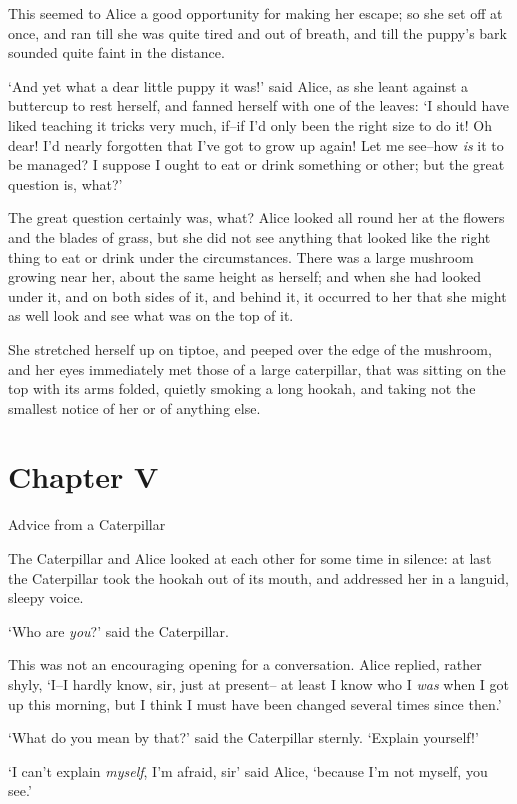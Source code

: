   This seemed to Alice a good opportunity for making her escape;
so she set off at once, and ran till she was quite tired and out
of breath, and till the puppy's bark sounded quite faint in the
distance.

  `And yet what a dear little puppy it was!' said Alice, as she
leant against a buttercup to rest herself, and fanned herself
with one of the leaves:  `I should have liked teaching it tricks
very much, if--if I'd only been the right size to do it!  Oh
dear!  I'd nearly forgotten that I've got to grow up again!  Let
me see--how {\it is} it to be managed?  I suppose I ought to eat or
drink something or other; but the great question is, what?'

  The great question certainly was, what?  Alice looked all round
her at the flowers and the blades of grass, but she did not see
anything that looked like the right thing to eat or drink under
the circumstances.  There was a large mushroom growing near her,
about the same height as herself; and when she had looked under
it, and on both sides of it, and behind it, it occurred to her
that she might as well look and see what was on the top of it.

  She stretched herself up on tiptoe, and peeped over the edge of
the mushroom, and her eyes immediately met those of a large
caterpillar, that was sitting on the top with its arms folded,
quietly smoking a long hookah, and taking not the smallest notice
of her or of anything else.



\chapter{Chapter V}{Advice from a Caterpillar}


  The Caterpillar and Alice looked at each other for some time in
silence:  at last the Caterpillar took the hookah out of its
mouth, and addressed her in a languid, sleepy voice.

  `Who are {\it you}?' said the Caterpillar.

  This was not an encouraging opening for a conversation.  Alice
replied, rather shyly, `I--I hardly know, sir, just at present--
at least I know who I {\it was} when I got up this morning, but I think
I must have been changed several times since then.'

  `What do you mean by that?' said the Caterpillar sternly.
`Explain yourself!'

  `I can't explain {\it myself}, I'm afraid, sir' said Alice, `because
I'm not myself, you see.'

